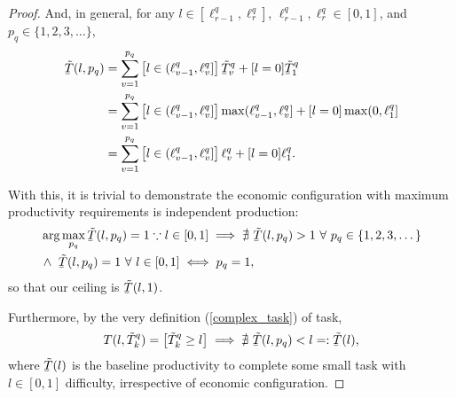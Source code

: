 \documentclass[hidelinks, nonatbib]{elsarticle}
\begin{document}
\begin{lemma}
\begin{proof}
        And, in general, for any $l \in [\ell_{r-1}^{q} ,\ell_{r}^{q}]$, $\ell_{r-1}^{q}, \ell_{r}^{q} \in [0,1]$, and $p_q \in \{1,2,3,\dots \}$,
        \begin{align}
            \underaccent{\bar}{\tilde{T}}(l, p_q)
            &=
            \sum_{v=1}^{p_q}\left[
                l \in (
                    \ell_{v-1}^{q}
                    ,\ell_{v}^{q}
                ]
            \right]
            \underaccent{\bar}{\tilde{T}}_{v}^{q}
            +
            [l = 0]
            \underaccent{\bar}{\tilde{T}}_{1}^{q}
            \\
            &=
            \sum_{v=1}^{p_q}\left[
                l \in (
                    \ell_{v-1}^{q}
                    ,\ell_{v}^{q}
                ]
            \right]
            \max(
                \ell_{v-1}^{q}
                ,\ell_{v}^{q}
            ]
            +
            [l = 0]
            \max(
                0
                ,\ell_{1}^{q}
            ]
            \\
            &=
            \sum_{v=1}^{p_q}\left[
                l \in (
                    \ell_{v-1}^{q}
                    ,\ell_{v}^{q}
                ]
            \right]
            \ell_{v}^{q}
            +
            [l = 0]
            \ell_{1}^{q}
            .
        \end{align}
        
        With this, it is trivial to demonstrate the economic configuration with maximum productivity requirements is independent production:
        \begin{align}
            &
            \arg\max_{p_q}{
                \underaccent{\bar}{\tilde{T}}(l, p_q)
            }
            =
            1
            \because
            l \in [0,1]
            \implies
            \nexists \
            \underaccent{\bar}{\tilde{T}}(l, p_q)
            >
            1
            \
            \forall
            \
            p_q \in \{1,2,3,\dots\}
            \\
            &
            \land \
            \underaccent{\bar}{\tilde{T}}(l, p_q)
            =
            1
            \
            \forall
            \
            l \in [0,1]
            \iff
            p_q = 1
            ,
        \end{align}
        so that our ceiling is $\underaccent{\bar}{\tilde{T}}(l, 1)$.

        Furthermore, by the very definition (\ref{complex_task}) of task,
        \begin{gather}
            \label{mrp}
            T(l, \tilde{T}_{k}^{q}) = 
            \left[
                \tilde{T}_{k}^{q}
                \geq
                l
            \right]
            \implies
            \nexists \
            \underaccent{\bar}{\tilde{T}}(l, p_q)
            <
            l
            =:
            \underaccent{\bar}{\tilde{T}}(l)
            ,
        \end{gather}
        where $\underaccent{\bar}{\tilde{T}}(l)$ is the baseline productivity to complete some small task with $l \in [0,1]$ difficulty, irrespective of economic configuration.
        

\end{proof}
\end{lemma}
\end{document}
